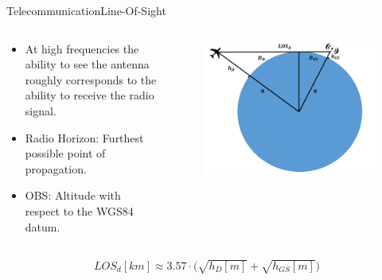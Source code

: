 

\begin{frame}{Telecommunication}{Line-Of-Sight}
  \begin{columns}[T]
    \begin{column}{.5\textwidth}
      \begin{block}{}
        \begin{itemize}
          \item {At high frequencies the ability to see the antenna roughly corresponds to the ability to receive the radio signal.}
          \item {Radio Horizon: Furthest possible point of propagation.}
          \item {OBS: Altitude with respect to the WGS84 datum.}
        \end{itemize}
      \end{block}
    \end{column}
    \begin{column}{.5\textwidth}
      \begin{figure}
        \includegraphics[scale=0.25]{figures/LOS.png}
      \end{figure}
    \end{column}
  \end{columns}

    \begin{align*}      
        LOS_d[km]  \approx {3.57\cdot (\sqrt{h_D[m]} + \sqrt{h_{GS}[m]}} )
    \end{align*}

\end{frame}


